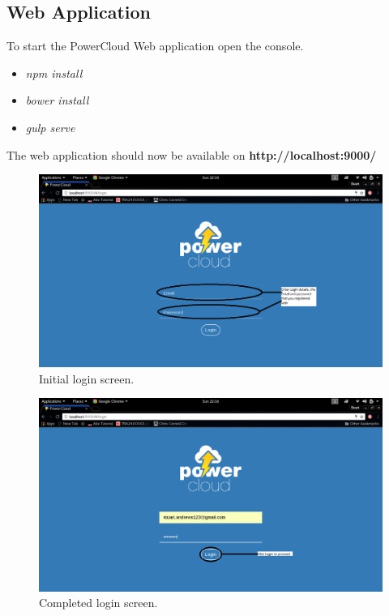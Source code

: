 \documentclass[a4paper,10pt]{article}
\begin{document}
	\subsection{Web Application}
	To start the PowerCloud Web application open the console.
	
	\begin{itemize}
		\item \textit{npm install}
		\item \textit{bower install}
		\item \textit{gulp serve}
	\end{itemize}
	
	The web application should now be available on \textbf{http://localhost:9000/}
	
	\begin{figure}[H]
		\includegraphics[width=\textwidth]{images/login.png}
		\caption{Initial login screen. \label{overflow}}
	\end{figure}
	
	\begin{figure}[H]
		\includegraphics[width=\textwidth]{images/login2.png}
		\caption{Completed login screen. \label{overflow}}
	\end{figure}
	
\end{document}
